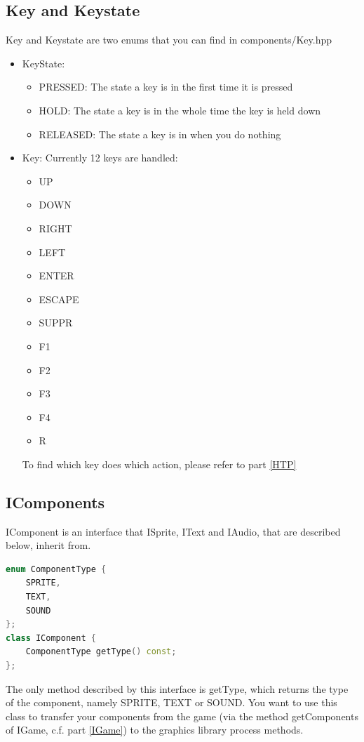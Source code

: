 \documentclass[12pt]{article}
\begin{document}
\subsection{Key and Keystate}
Key and Keystate are two enums that you can find in components/Key.hpp
\begin{itemize}
    \item KeyState:
    \begin{itemize}
        \item PRESSED: The state a key is in the first time it is pressed
        \item HOLD: The state a key is in the whole time the key is held down
        \item RELEASED: The state a key is in when you do nothing
    \end{itemize}
    \newpage
    \item Key:
    Currently 12 keys are handled:
    \begin{itemize}
        \item UP
        \item DOWN
        \item RIGHT
        \item LEFT
        \item ENTER
        \item ESCAPE
        \item SUPPR
        \item F1
        \item F2
        \item F3
        \item F4
        \item R
    \end{itemize}
    To find which key does which action, please refer to part \ref{HTP}
\end{itemize}
\subsection{IComponents}
IComponent is an interface that ISprite, IText and IAudio, that are described below, inherit from.
\begin{lstlisting}[language=c++]
enum ComponentType {
	SPRITE,
	TEXT,
	SOUND
};
class IComponent {
	ComponentType getType() const;
};
\end{lstlisting}
The only method described by this interface is getType, which returns the type of the component, namely SPRITE, TEXT or SOUND.\newline
You want to use this class to transfer your components from the game (via the method getComponents of IGame, c.f. part \ref{IGame}) to the graphics library process methods.
\end{document}
